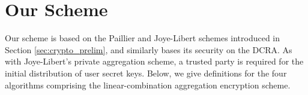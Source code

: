 \documentclass[twocolumn]{autart}
\begin{document}
% 
%                                                                                                
%                                                                                                
%                                                                                                
% 

\section{Our Scheme} \label{sec:our_scheme}
Our scheme is based on the Paillier and Joye-Libert schemes introduced in Section \ref{sec:crypto_prelim}, and similarly bases its security on the DCRA. As with Joye-Libert's private aggregation scheme, a trusted party is required for the initial distribution of user secret keys. Below, we give definitions for the four algorithms comprising the linear-combination aggregation encryption scheme.
\end{document}
